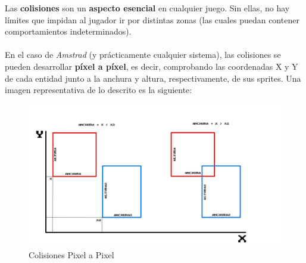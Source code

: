 Las \textbf{colisiones} son un \textbf{aspecto esencial} en cualquier juego. Sin ellas, no hay límites que impidan al jugador ir por distintas zonas (las cuales puedan contener comportamientos indeterminados).
\\ \\
En el caso de \textit{Amstrad} (y prácticamente cualquier sistema), las colisiones se pueden desarrollar \textbf{píxel a píxel}, es decir, comprobando las coordenadas X y Y de cada entidad junto a la anchura y altura, respectivamente, de sus sprites. Una imagen representativa de lo descrito es la siguiente:

\begin{figure}[h]
\centering
\includegraphics[width=1\textwidth]{include/images/desarrollo/collision_theory.png}
\caption{Colisiones Pixel a Pixel}
\label{figure:collision_theory}
\end{figure}


